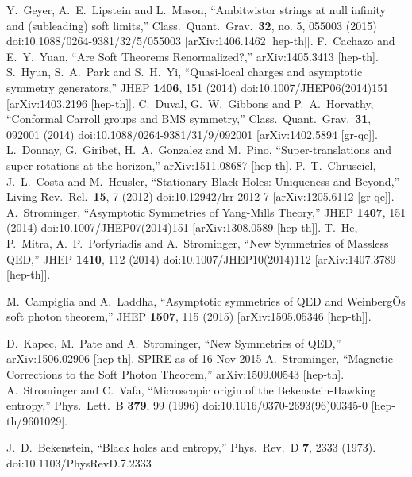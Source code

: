 \documentclass[12pt]{article}
\numberwithin{equation}{section}
\begin{document}
\begin{thebibliography}{99}
  Y.~Geyer, A.~E.~Lipstein and L.~Mason,
  ``Ambitwistor strings at null infinity and (subleading) soft limits,''
  Class.\ Quant.\ Grav.\  {\bf 32}, no. 5, 055003 (2015)
  doi:10.1088/0264-9381/32/5/055003
  [arXiv:1406.1462 [hep-th]].
  F.~Cachazo and E.~Y.~Yuan,
  ``Are Soft Theorems Renormalized?,''
  arXiv:1405.3413 [hep-th].
  S.~Hyun, S.~A.~Park and S.~H.~Yi,
  ``Quasi-local charges and asymptotic symmetry generators,''
  JHEP {\bf 1406}, 151 (2014)
  doi:10.1007/JHEP06(2014)151
  [arXiv:1403.2196 [hep-th]].
  C.~Duval, G.~W.~Gibbons and P.~A.~Horvathy,
  ``Conformal Carroll groups and BMS symmetry,''
  Class.\ Quant.\ Grav.\  {\bf 31}, 092001 (2014)
  doi:10.1088/0264-9381/31/9/092001
  [arXiv:1402.5894 [gr-qc]].
  L.~Donnay, G.~Giribet, H.~A.~Gonzalez and M.~Pino,
  ``Super-translations and super-rotations at the horizon,''
  arXiv:1511.08687 [hep-th].
 P.~T.~Chrusciel, J.~L.~Costa and M.~Heusler,
 ``Stationary Black Holes: Uniqueness and Beyond,''
 Living Rev.\ Rel.\  {\bf 15}, 7 (2012)
 doi:10.12942/lrr-2012-7
 [arXiv:1205.6112 [gr-qc]].
  A.~Strominger,
  ``Asymptotic Symmetries of Yang-Mills Theory,''
  JHEP {\bf 1407}, 151 (2014)
  doi:10.1007/JHEP07(2014)151
  [arXiv:1308.0589 [hep-th]].
  T.~He, P.~Mitra, A.~P.~Porfyriadis and A.~Strominger,
  ``New Symmetries of Massless QED,''
  JHEP {\bf 1410}, 112 (2014)
  doi:10.1007/JHEP10(2014)112
  [arXiv:1407.3789 [hep-th]].

  M.~Campiglia and A.~Laddha,
  ``Asymptotic symmetries of QED and WeinbergÕs soft photon theorem,''
  JHEP {\bf 1507}, 115 (2015)
  [arXiv:1505.05346 [hep-th]].

  D.~Kapec, M.~Pate and A.~Strominger,
  ``New Symmetries of QED,''
  arXiv:1506.02906 [hep-th].
 SPIRE as of 16 Nov 2015
  A.~Strominger,
  ``Magnetic Corrections to the Soft Photon Theorem,''
  arXiv:1509.00543 [hep-th].
  A.~Strominger and C.~Vafa,
  ``Microscopic origin of the Bekenstein-Hawking entropy,''
  Phys.\ Lett.\ B {\bf 379}, 99 (1996)
  doi:10.1016/0370-2693(96)00345-0
  [hep-th/9601029].
 

  J.~D.~Bekenstein,
  ``Black holes and entropy,''
  Phys.\ Rev.\ D {\bf 7}, 2333 (1973).
  doi:10.1103/PhysRevD.7.2333


\end{thebibliography}
\end{document}
